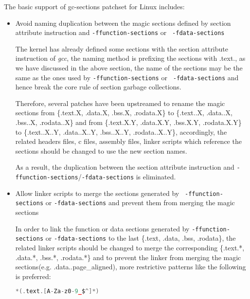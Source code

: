 \documentclass[10pt,a4paper]{article}
\begin{document}
\begin{multicols}{2}
The basic support of gc-sections patchset for Linux includes:

\begin{itemize}

\item Avoid naming duplication between the magic sections defined by section
attribute instruction and {\small {\tt -ffunction-sections}} or {\small {\tt
	-fdata-sections}}

The kernel has already defined some sections with the section attribute
instruction of {\em gcc}, the naming method is prefixing the sections with .text., as
we have discussed in the above section, the name of the sections may be the
same as the ones used by {\small {\tt -ffunction-sections}} or {\small {\tt
-fdata-sections}} and hence break the core rule of section garbage collections.

Therefore, several patches have been upstreamed to rename the magic sections
from \{.text.X, .data.X, .bss.X, .rodata.X\} to \{.text..X, .data..X, .bss..X,
     .rodata..X\} and from \{.text.X.Y, .data.X.Y, .bss.X.Y, .rodata.X.Y\} to
     \{.text..X..Y, .data..X..Y, .bss..X..Y, .rodata..X..Y\}, accordingly, the
     related headers files, c files, assembly files, linker scripts which
     reference the sections should be changed to use the new section names.

As a result, the duplication between the section attribute instruction and
{\small {\tt -ffunction-sections}}/{\small {\tt -fdata-sections}} is
eliminated.

\item Allow linker scripts to merge the sections generated by {\small {\tt
	-ffunction-sections}} or {\small {\tt -fdata-sections}} and prevent
	them from merging the magic sections

In order to link the function or data sections generated by {\small {\tt -ffunction-sections}}
or {\small {\tt -fdata-sections}} to the last \{.text,
.data, .bss, .rodata\}, the related linker scripts should be changed to merge the
corresponding \{.text.*, .data.*, .bss.*, .rodata.*\} and to prevent the linker
from merging the magic sections(e.g. .data..page\_aligned), more restrictive
patterns like the following is preferred:

\begin{lstlisting}[language=c,
                  commentstyle=\fontsize{7}{8}\selectfont,
                  basicstyle=\ttfamily\fontsize{7}{8}\selectfont]
*(.text.[A-Za-z0-9_$^]*)
\end{lstlisting}


\end{itemize}
\end{multicols}
\end{document}
